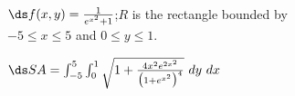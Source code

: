 {$\ds f(x,y) = \frac{1}{e^{x^2}+1}$;\quad $R$ is the rectangle bounded by\\[5pt]
 $-5\leq x\leq 5$ and $0\leq y\leq 1$.

}
{$\ds SA = \int_{-5}^{5}\int_{0}^{1} \sqrt{1+ \frac{4x^2e^{2x^2}}{\big(1+e^{x^2}\big)^4}}\ dy\ dx$
}